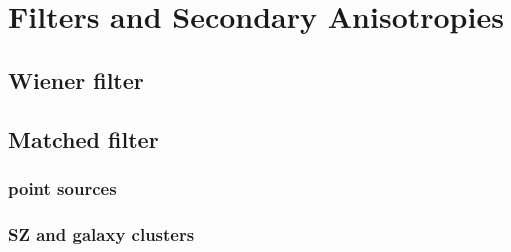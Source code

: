 \chapter{Filters and Secondary Anisotropies}\label{ch:secondaries}


\section{Wiener filter}



\section{Matched filter}

\subsection{point sources}

\subsection{SZ and galaxy clusters}

